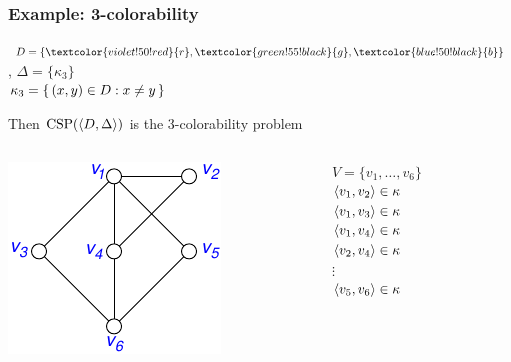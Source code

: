 \documentclass[12pt,xcolor=dvipsnames%
   ]{beamer}
\DeclareMathOperator{\CSP}{CSP}
\renewcommand{\.}{\cdot}
\newcommand{\Blue}{\textcolor{blue!50!black}}
\newcommand{\Red}{\textcolor{violet!50!red}}
\newcommand{\Green}{\textcolor{green!55!black}}
\begin{document}
\begin{frame}
  \frametitle{Example: 3-colorability}

  $D=\{\Red{r},\Green{g},\Blue{b}\}$, \quad $\Delta=\{\kappa_3\}$\\
  $\kappa_3=\left\{\,(x,y)\in D : x\neq y\,\right\}$

  Then $\CSP(\<D,\Delta\>)$ is the 3-colorability problem

  \bigskip

    \begin{columns}
      \begin{column}{1.5in}
        \includegraphics{../inputs/col_csp}
      \end{column}
      \begin{column}{2in}
        $V=\{v_1,\dots,v_6\}$\\
        $\langle v_1,v_2\rangle\in \kappa$\\
        $\langle v_1,v_3\rangle\in \kappa$\\
        $\langle v_1,v_4\rangle\in \kappa$\\
        $\langle v_2,v_4\rangle\in \kappa$\\
        \qquad$\vdots$\\
        $\langle v_5,v_6\rangle\in \kappa$
      \end{column}
    \end{columns}
  \end{frame}
\end{document}
